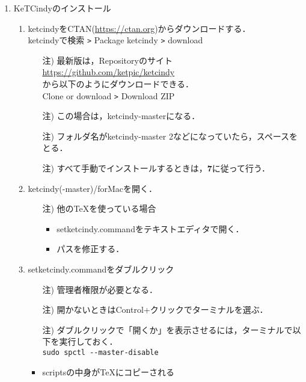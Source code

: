 \documentclass{ujarticle}
\begin{document}
\begin{enumerate}[\bf\large 1.]
\item KeTCindyのインストール
  \begin{enumerate}[(1)]
  \item ketcindyをCTAN(\url{https://ctan.org})からダウンロードする．\\
  \hspace*{10mm}ketcindyで検索 \verb|>| Package ketcindy \verb|>| download
    \begin{itemize}
    \item[注)]最新版は，Repositoryのサイト\\
        \hspace*{10mm}\url{https://github.com/ket­pic/ketcindy}\\
       から以下のようにダウンロードできる．\\
        \hspace*{10mm}Clone or download \verb|>| Download ZIP
    \item[注)]この場合は，ketcindy-masterになる．
    \item[注)] フォルダ名がketcindy-master 2などになっていたら，スペースをとる．
    \item[注)] すべて手動でインストールするときは，{\bf 7}に従って行う．
    \end{itemize}
  \item ketcindy(-master)/forMacを開く．
    \begin{itemize}
    \item[注)]他のTeXを使っている場合
      \begin{itemize}
      \item setketcindy.commandをテキストエディタで開く．
      \item パスを修正する．
      \end{itemize}
    \end{itemize}
  \item setketcindy.commandをダブルクリック
    \begin{itemize}
    \item[注)]管理者権限が必要となる．
    \item[注)]開かないときはControl+クリックでターミナルを選ぶ．
    \item[注)]ダブルクリックで「開くか」を表示させるには，ターミナルで以下を実行しておく．\\
    \hspace*{20mm}\verb|sudo spctl --master-disable|
    \end{itemize}
    \begin{itemize}
    \item scriptsの中身がTeXにコピーされる

\end{itemize}
\end{enumerate}
\end{enumerate}
\end{document}
